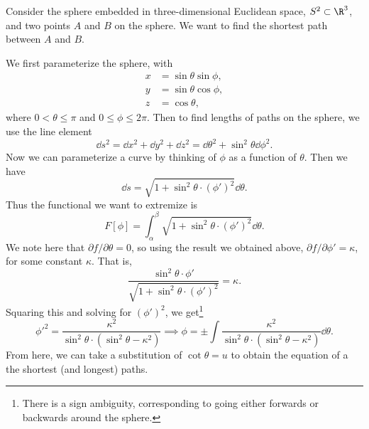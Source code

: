\documentclass[a4paper]{scrartcl}
\begin{document}
\begin{example}
	Consider the sphere embedded in three-dimensional Euclidean space, $S^2 \subset \R^3$, and two points $A$ and $B$ on the sphere. We want to find the shortest path between $A$ and $B$.

	\begin{center}
	\end{center}

	We first parameterize the sphere, with
	\begin{align*}
		x &= \sin \theta \sin \phi, \\
		y &= \sin \theta \cos \phi, \\
		z &= \cos \theta,
	\end{align*}
	where $0 < \theta \leq \pi$ and $0 \leq \phi \leq 2 \pi$. Then to find lengths of paths on the sphere, we use the line element
	$$
	\dd s^2 = \dd x^2 + \dd y^2 + \dd z^2 = \dd \theta^2 + \sin^2 \theta \dd \phi^2.
	$$
	Now we can parameterize a curve by thinking of $\phi$ as a function of $\theta$. Then we have
	$$
	\dd s = \sqrt{1 + \sin^2 \theta \cdot (\phi')^2} \dd \theta.
	$$
	Thus the functional we want to extremize is
	$$
	F[\phi] = \int_{\alpha}^{\beta} \sqrt{1 + \sin^2 \theta \cdot (\phi')^2} \dd \theta.
	$$
	We note here that $\partial f/ \partial \theta = 0$, so using the result we obtained above, $\partial f/\partial \phi' = \kappa$, for some constant $\kappa$. That is,
	$$
\frac{\sin^2 \theta \cdot \phi'}{\sqrt{1 + \sin^2 \theta \cdot (\phi')^2}} = \kappa.
	$$
	Squaring this and solving for $(\phi')^2$, we get\footnote{There is a sign ambiguity, corresponding to going either forwards or backwards around the sphere.}
	$$
	\phi'^2 = \frac{\kappa^2}{\sin^2 \theta \cdot (\sin^2 \theta - \kappa^2)} \implies \phi = \pm \int \frac{\kappa^2}{\sin^2 \theta \cdot (\sin^2 \theta - \kappa^2)} \dd \theta.
	$$
	From here, we can take a substitution of $\cot \theta = u$ to obtain the equation of a the shortest (and longest) paths.
\end{example}
\end{document}
